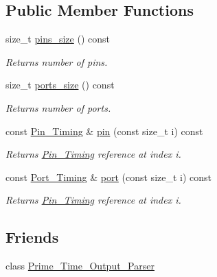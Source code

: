 \subsection*{Public Member Functions}
\begin{DoxyCompactItemize}
\item 
size\-\_\-t \hyperlink{classPrime__Time__Output__Parser_1_1Prime__Time__Output_af89e7f909821e56d0e89ae62cebc5b81}{pins\-\_\-size} () const 
\begin{DoxyCompactList}\small\item\em Returns number of pins. \end{DoxyCompactList}\item 
size\-\_\-t \hyperlink{classPrime__Time__Output__Parser_1_1Prime__Time__Output_a6fdf8bbe0ea6ecdcdecec62e0922625f}{ports\-\_\-size} () const 
\begin{DoxyCompactList}\small\item\em Returns number of ports. \end{DoxyCompactList}\item 
const \hyperlink{structPrime__Time__Output__Parser_1_1Pin__Timing}{Pin\-\_\-\-Timing} \& \hyperlink{classPrime__Time__Output__Parser_1_1Prime__Time__Output_adfa3dff9af20ebb0872d4c775b3eeecc}{pin} (const size\-\_\-t i) const 
\begin{DoxyCompactList}\small\item\em Returns \hyperlink{structPrime__Time__Output__Parser_1_1Pin__Timing}{Pin\-\_\-\-Timing} reference at index i. \end{DoxyCompactList}\item 
const \hyperlink{structPrime__Time__Output__Parser_1_1Port__Timing}{Port\-\_\-\-Timing} \& \hyperlink{classPrime__Time__Output__Parser_1_1Prime__Time__Output_a36d4fa1cf4175cce9bac2fb27ea98f72}{port} (const size\-\_\-t i) const 
\begin{DoxyCompactList}\small\item\em Returns \hyperlink{structPrime__Time__Output__Parser_1_1Pin__Timing}{Pin\-\_\-\-Timing} reference at index i. \end{DoxyCompactList}\end{DoxyCompactItemize}
\subsection*{Friends}
\begin{DoxyCompactItemize}
\item 
class \hyperlink{classPrime__Time__Output__Parser_1_1Prime__Time__Output_add497bc1a470cf507522a48873d2b9b7}{Prime\-\_\-\-Time\-\_\-\-Output\-\_\-\-Parser}
\end{DoxyCompactItemize}


